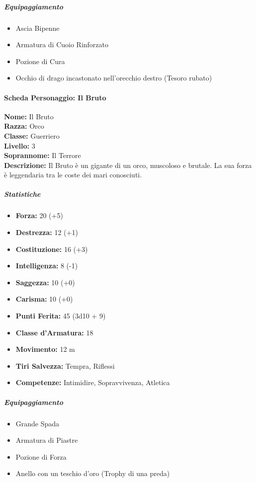 \documentclass{article}
\begin{document}
\subparagraph*{Equipaggiamento}
\begin{itemize}
  \item Ascia Bipenne
  \item Armatura di Cuoio Rinforzato
  \item Pozione di Cura
  \item Occhio di drago incastonato nell'orecchio destro (Tesoro rubato)
\end{itemize}

\paragraph*{Scheda Personaggio: Il Bruto}

\textbf{Nome:} Il Bruto \\
\textbf{Razza:} Orco \\
\textbf{Classe:} Guerriero \\
\textbf{Livello:} 3 \\
\textbf{Soprannome:} Il Terrore \\
\textbf{Descrizione:} Il Bruto è un gigante di un orco, muscoloso e brutale. La sua forza è leggendaria tra le coste dei mari conosciuti. 

\subparagraph*{Statistiche}

\begin{itemize}
  \item \textbf{Forza:} 20 (+5)
  \item \textbf{Destrezza:} 12 (+1)
  \item \textbf{Costituzione:} 16 (+3)
  \item \textbf{Intelligenza:} 8 (-1)
  \item \textbf{Saggezza:} 10 (+0)
  \item \textbf{Carisma:} 10 (+0)
\end{itemize}

\begin{itemize}
  \item \textbf{Punti Ferita:} 45 (3d10 + 9)
  \item \textbf{Classe d'Armatura:} 18
  \item \textbf{Movimento:} 12 m
  \item \textbf{Tiri Salvezza:} Tempra, Riflessi
  \item \textbf{Competenze:} Intimidire, Sopravvivenza, Atletica
\end{itemize}


\subparagraph*{Equipaggiamento}
\begin{itemize}
  \item Grande Spada
  \item Armatura di Piastre
  \item Pozione di Forza
  \item Anello con un teschio d'oro (Trophy di una preda)
\end{itemize}
\end{document}
